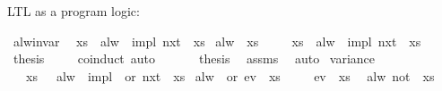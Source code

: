 \begin{isabellebody}
\isamarkupfalse%
%
\endisatagproof
{\isafoldproof}%
%
\isadelimproof
%
\endisadelimproof
%
\begin{isamarkuptext}%
LTL as a program logic:%
\end{isamarkuptext}\isamarkuptrue%
\isamarkupfalse%
\ alw{\isacharunderscore}invar{\isacharcolon}\isanewline
{}\ {\isachardoublequoteopen}{\isasymphi}\ xs{\isachardoublequoteclose}\ \ {\isachardoublequoteopen}alw\ {\isacharparenleft}{\isasymphi}\ impl\ nxt\ {\isasymphi}{\isacharparenright}\ xs{\isachardoublequoteclose}\isanewline
{}\ {\isachardoublequoteopen}alw\ {\isasymphi}\ xs{\isachardoublequoteclose}\isanewline
%
\isadelimproof
%
\endisadelimproof
%
\isatagproof
{}\isamarkupfalse%
{\isacharminus}\isanewline
\ \ \isacommand{{\isacharbraceleft}}\isamarkupfalse%
\isamarkupfalse%
\ {\isachardoublequoteopen}{\isasymphi}\ xs\ {\isasymand}\ alw\ {\isacharparenleft}{\isasymphi}\ impl\ nxt\ {\isasymphi}{\isacharparenright}\ xs{\isachardoublequoteclose}\ \isamarkupfalse%
\ {\isacharquery}thesis\isanewline
\ \ \ \isamarkupfalse%
\ coinduct\ auto\isanewline
\ \ \isacommand{{\isacharbraceright}}\isamarkupfalse%
\isanewline
\ \ \isamarkupfalse%
\ {\isacharquery}thesis\ \isamarkupfalse%
\ assms\ \isamarkupfalse%
\ auto\isanewline
{}\isamarkupfalse%
%
\endisatagproof
{\isafoldproof}%
%
\isadelimproof
\isanewline
%
\endisadelimproof
\isanewline
{}\isamarkupfalse%
\ variance{\isacharcolon}\isanewline
{}\ {}{\isacharcolon}\ {\isachardoublequoteopen}{\isasymphi}\ xs{\isachardoublequoteclose}\ \ {}{\isacharcolon}\ {\isachardoublequoteopen}alw\ {\isacharparenleft}{\isasymphi}\ impl\ {\isacharparenleft}{\isasympsi}\ or\ nxt\ {\isasymphi}{\isacharparenright}{\isacharparenright}\ xs{\isachardoublequoteclose}\isanewline
{}\ {\isachardoublequoteopen}{\isacharparenleft}alw\ {\isasymphi}\ or\ ev\ {\isasympsi}{\isacharparenright}\ xs{\isachardoublequoteclose}\isanewline
%
\isadelimproof
%
\endisadelimproof
%
\isatagproof
{}\isamarkupfalse%
{\isacharminus}\isanewline
\ \ \isacommand{{\isacharbraceleft}}\isamarkupfalse%
\isamarkupfalse%
\ {\isachardoublequoteopen}{\isasymnot}\ ev\ {\isasympsi}\ xs{\isachardoublequoteclose}\ \isamarkupfalse%
\ {\isachardoublequoteopen}alw\ {\isacharparenleft}not\ {\isasympsi}{\isacharparenright}\ xs{\isachardoublequoteclose}\ \isamarkupfalse%

\end{isabellebody}
